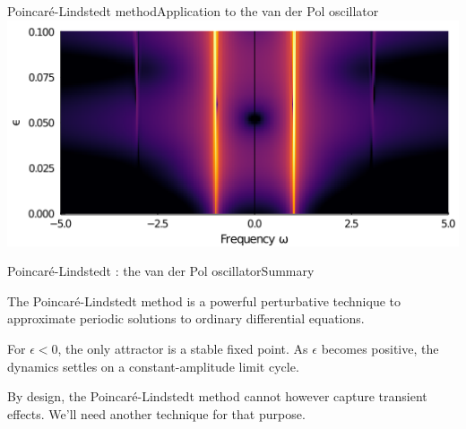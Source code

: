 \documentclass[usenames,dvipsnames,svgnames,10pt,aspectratio=169]{beamer}
\begin{document}
\begin{frame}[t, c]{Poincaré-Lindstedt method}{Application to the van der Pol oscillator}
  \centering
  \includegraphics[width=.8\textwidth]{van_der_pol_spectrum}
\end{frame}

\begin{frame}[t, c]{Poincaré-Lindstedt : the van der Pol oscillator}{Summary}
  \begin{minipage}{.68\textwidth}
    The Poincaré-Lindstedt method is a powerful perturbative technique to approximate periodic solutions to ordinary differential equations.

    \bigskip

    For $\epsilon < 0$, the only attractor is a stable fixed point.
    As $\epsilon$ becomes positive, the dynamics settles on a constant-amplitude limit cycle.

    \bigskip

    By design, the Poincaré-Lindstedt method cannot however capture transient effects.
    We'll need another technique for that purpose.
  \end{minipage}%
  \hfill
  \begin{minipage}{.28\textwidth}
    \centering
  \end{minipage}

\end{frame}
\end{document}
